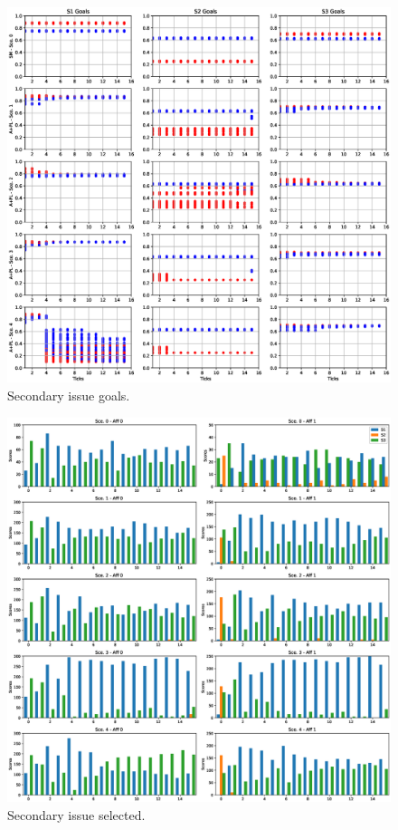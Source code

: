 \documentclass[12pt]{article}
\begin{document}
\begin{figure}
\centering
\includegraphics[width = 0.95\linewidth, angle = 0]{figures/PE_PL_SGoals}
\caption{Secondary issue goals.}
\label{fig:PE_PL_SGoals}
\end{figure}

\begin{figure}
\centering
\includegraphics[width = 0.95\linewidth, angle = 0]{figures/PE_PL_SSelected}
\caption{Secondary issue selected.}
\label{fig:PE_PL_SSelected}
\end{figure}
\end{document}
